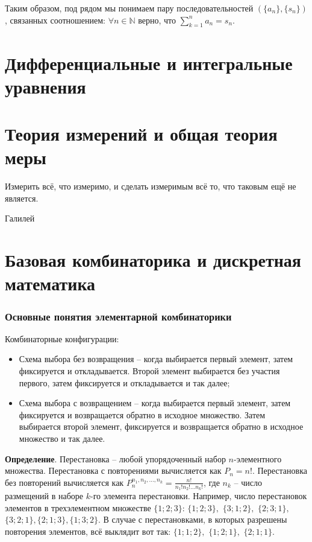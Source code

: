 \documentclass[a4paper]{book}
\begin{document}
Таким образом, под рядом мы понимаем пару последовательностей $(\{a_n\},\{s_n\})$, связанных соотношением: $\forall n\in\mathbb{N}$ верно, что $\sum_{k=1}^{n} a_n = s_n$. 


\chapter{Дифференциальные и интегральные уравнения}
 

\chapter{Теория измерений и общая теория меры}

\begin{flushright}
	Измерить всё, что измеримо, и сделать измеримым всё то, что таковым ещё не является.
	 
	Галилей
\end{flushright}
\chapter{Базовая комбинаторика и дискретная математика}

\subsection{Основные понятия элементарной комбинаторики}

Комбинаторные конфигурации: 
\begin{itemize}
	\item Схема выбора без возвращения -- когда выбирается первый элемент, затем фиксируется и откладывается. Второй элемент выбирается без участия первого, затем фиксируется и откладывается и так далее;
	\item Схема выбора с возвращением -- когда выбирается первый элемент, затем фиксируется и возвращается обратно в исходное множество. Затем выбирается второй элемент, фиксируется и возвращается обратно в исходное множество и так далее. 
\end{itemize}

\textbf{Определение}. Перестановка -- любой упорядоченный набор $n$-элементного множества. 
Перестановка с повторениями вычисляется как $P_n = n!$. Перестановка без повторений вычисляется как $P^{n_1,n_2,...,n_k}_n = \frac{n!}{n_{1}!n_{2}!...n_{k}!}$, где $n_k$ -- число размещений в наборе $k$-го элемента перестановки. Например, число перестановок элементов в трехэлементном множестве $\{1;2;3\}$: $\{1;2;3\},$ $\{3;1;2\},$ $\{2;3;1\},$ $\{3;2;1\}, \{2;1;3\}, \{1;3;2\}$. В случае с перестановками, в которых разрешены повторения элементов, всё выклядит вот так: $\{1;1;2\},$ $\{1;2;1\},$ $\{2;1;1\}$. 
\end{document}
